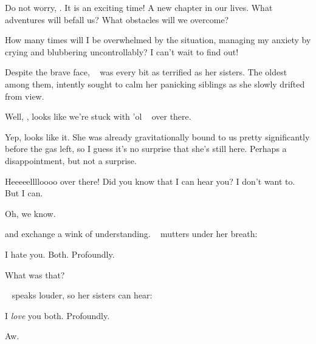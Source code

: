 \documentclass[main.tex]{subfiles}
\begin{document}
\par \Sterope Do not worry, \rmelectra.  It is an exciting time!  A new chapter in our lives.  What adventures will befall us?  What obstacles will we overcome?  

\par \Electra How many times will I be overwhelmed by the situation, managing my anxiety by crying and blubbering uncontrollably? I can't wait to find out!

\par \nar Despite the brave face, \rmmaia~ was every bit as terrified as her sisters.  The oldest among them, \rmmaia intently sought to calm her panicking siblings as she slowly drifted from view.

\par \Taygete Well, \rmalcyone, looks like we're stuck with 'ol \rmcelaeno~ over there.

\par \Alcyone Yep, looks like it.  She was already gravitationally bound to us pretty significantly before the gas left, so I guess it's no surprise that she's still here.  Perhaps a disappointment, but not a surprise.

\par \Celaeno Heeeeelllloooo over there!  Did you know that I can hear you?  I don't want to.  But I can.

\par \Taygete Oh, we know. 

\par \nar \rmtaygete and \rmalcyone exchange a wink of understanding.  \rmcelaeno~ mutters under her breath:

\par \Celaeno I hate you.  Both.  Profoundly.

\par \Taygete What was that?

\par \nar \rmcelaeno~ speaks louder, so her sisters can hear:

\par \Celaeno I \textit{love} you both.  Profoundly.

\par \Alcyone Aw.
\end{document}
